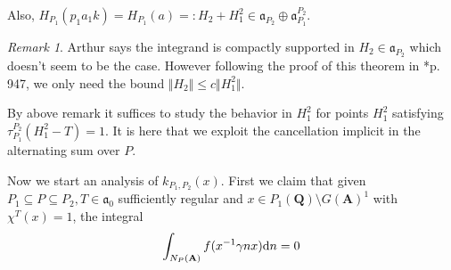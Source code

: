 \documentclass[11pt]{amsart}
\def\A{\mathbf A}
\def\Q{\mathbf Q}
\def\aaa{\mathfrak a}
\def\d{\text d}
\def\bs{\setminus} 			%
\def\norm#1{\Vert #1 \Vert} %
\def\se{\subseteq}
\theoremstyle{remark}
\newtheorem{remark}[theorem]{Remark}
\begin{document}
Also, $H_{P_1}(p_1 a_1 k) = H_{P_1}(a) =: H_2 + H_1^2 \in \aaa_{P_2} \oplus \aaa_{P_1}^{P_2}$. 

\begin{remark}
	Arthur says the integrand is compactly supported in $H_2 \in \aaa_{P_2}$ which doesn't seem to be the case. However following the proof of this theorem in \cite{duke}*{p. 947}, we only need the bound $\norm{H_2} \leq c \norm{H_1^2}$. 
\end{remark}

By above remark it suffices to study the behavior in $H_1^2$ for points $H_1^2$ satisfying $\tau_{P_1}^{P_2}(H_1^2 - T) = 1$. It is here that we exploit the cancellation implicit in the alternating sum over $P$. 

Now we start an analysis of $k_{P_1, P_2}(x)$. First we claim that given $P_1 \se P \se P_2, T \in \aaa_0$ sufficiently regular and $x \in P_1(\Q)\bs G(\A)^1$ with $\chi^T(x) = 1$, the integral 
\[ \int_{N_P(\A)} f(x^{-1}\gamma n x) \d n = 0 \]
\end{document}
